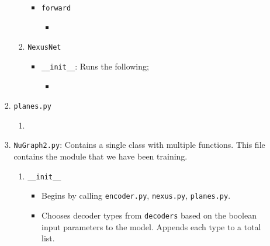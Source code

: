 \begin{itemize}
\begin{enumerate}
\begin{enumerate}
\begin{enumerate}
\begin{itemize}
                                    \item \texttt{forward}
                                        \begin{itemize}
                                            \item 
                                        \end{itemize}
                                \end{itemize}

                            \item \texttt{NexusNet}
                                \begin{itemize} 
                                    \item \texttt{\_\_init\_\_}: Runs the following;
                                        \begin{itemize}
                                            \item \texttt{}
                                        \end{itemize}
                                \end{itemize}
                        \end{enumerate}

                    \item \texttt{planes.py}
                        \begin{enumerate}
                            \item
                        \end{enumerate}

                    \item \texttt{NuGraph2.py}: Contains a single class with multiple functions. This file contains the module that we have been training.
                        \begin{enumerate}
                            \item \texttt{\_\_init\_\_}
                            \begin{itemize}
                                \item Begins by calling \texttt{encoder.py}, \texttt{nexus.py}, \texttt{planes.py}.

                                \item Chooses decoder types from \texttt{decoders} based on the boolean input parameters to the model. Appends each type to a total list.
                            \end{itemize}


\end{enumerate}
\end{enumerate}
\end{enumerate}
\end{itemize}
